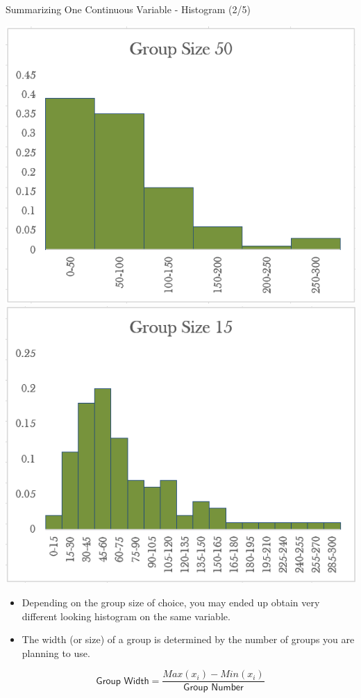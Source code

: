 \documentclass{beamer}
\begin{document}
\begin{frame}{Summarizing One Continuous Variable - Histogram (2/5)}

\begin{center}

\includegraphics[scale=0.31]{images/ch2Histogram1.png}
\includegraphics[scale=0.34]{images/ch2Histogram2.png}
\end{center}


\begin{scriptsize}
\begin{itemize}
\item Depending on the group size of choice, you may ended up obtain very different looking histogram on the same variable.
\item The width (or size) of a group is determined by the number of groups you are planning to use. 

\end{itemize}

$$ \textsf{Group Width} = \frac{Max(x_i)-Min(x_i)}{\textsf{Group Number}}$$

\end{scriptsize}



\end{frame}
\end{document}
